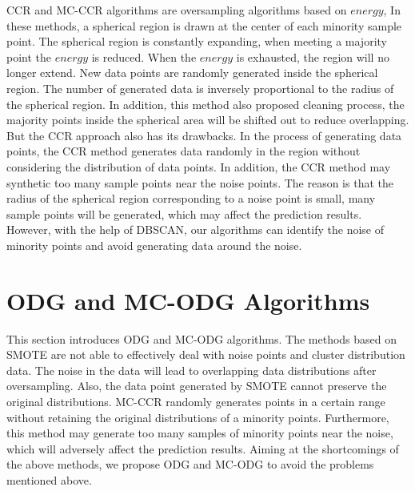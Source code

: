 \documentclass[runningheads]{llncs}
\begin{document}
CCR\cite{2017CCR} and MC-CCR\cite{2020Combined} algorithms are oversampling algorithms based on $energy$,
In these methods, a spherical region is drawn at the center of each minority sample point. 
The spherical region is constantly expanding, when meeting a majority point the $energy$ is reduced.
When the $energy$ is exhausted, the region will no longer extend.
New data points are randomly generated inside the spherical region. 
The number of generated data is inversely proportional to the radius of the spherical region.
In addition, this method also proposed cleaning process, 
the majority points inside the spherical area will be shifted out to reduce overlapping.
But the CCR approach also has its drawbacks. In the process of generating data points,
the CCR method generates data randomly in the region without considering the distribution of data points.
In addition, the CCR method may synthetic too many sample points near the noise points. 
The reason is that the radius of the spherical region corresponding 
to a noise point is small, 
many sample points will be generated, which may affect the prediction results.
However, with the help of DBSCAN, our algorithms can identify the noise of minority points and 
avoid generating data around the noise.


\section{ODG and MC-ODG Algorithms}
This section introduces ODG and MC-ODG algorithms.
The methods based on SMOTE are not able to effectively deal with noise points and cluster distribution data.
The noise in the data will lead to overlapping data distributions after oversampling.
Also, the data point generated by SMOTE cannot preserve the original distributions.
MC-CCR randomly generates points in a certain range without retaining the original distributions of a minority points.
Furthermore, this method may generate too many samples of 
minority points near the noise, which will adversely affect the prediction results.
Aiming at the shortcomings of the above methods, 
we propose ODG and MC-ODG to avoid the problems mentioned above.
\end{document}
